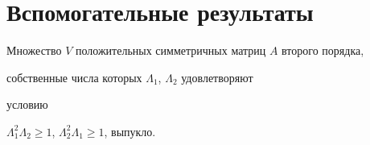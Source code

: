 \section{Вспомогательные результаты}





\begin{lem}


Множество $V$ положительных симметричных матриц $A$ второго порядка,


собственные числа которых $\Lambda_1$, $\Lambda_2$ удовлетворяют


условию


$\Lambda^2_1\Lambda_2\ge 1$, $\Lambda^2_2\Lambda_1\ge 1$, выпукло.


\end{lem}





